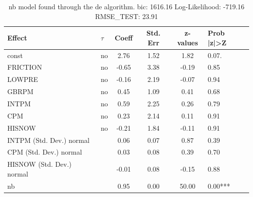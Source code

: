 \begin{table}
	\caption{nb model found through the de algorithm. bic: 1616.16 Log-Likelihood: -719.16 RMSE_TEST: 23.91}
	\begin{center}
		\begin{tabular}{|l|l|c|c|c|l|}
			\hline
			Effect & $\tau$ & Coeff & Std. Err & z-values & Prob |z|>Z \\
			\hline
			const & no & 2.76 & 1.52 & 1.82 & 0.07. \\
			\hline
			FRICTION & no & -0.65 & 3.38 & -0.19 & 0.85 \\
			\hline
			LOWPRE & no & -0.16 & 2.19 & -0.07 & 0.94 \\
			\hline
			GBRPM & no & 0.45 & 1.09 & 0.41 & 0.68 \\
			\hline
			INTPM & no & 0.59 & 2.25 & 0.26 & 0.79 \\
			\hline
			CPM & no & 0.23 & 2.14 & 0.11 & 0.91 \\
			\hline
			HISNOW & no & -0.21 & 1.84 & -0.11 & 0.91 \\
			\hline
			INTPM (Std. Dev.) normal &  & 0.06 & 0.07 & 0.87 & 0.39 \\
			\hline
			CPM (Std. Dev.) normal &  & 0.03 & 0.08 & 0.39 & 0.70 \\
			\hline
			HISNOW (Std. Dev.) normal &  & -0.01 & 0.08 & -0.15 & 0.88 \\
			\hline
			nb &  & 0.95 & 0.00 & 50.00 & 0.00*** \\
			\hline
		\end{tabular}
	\end{center}
\end{table}